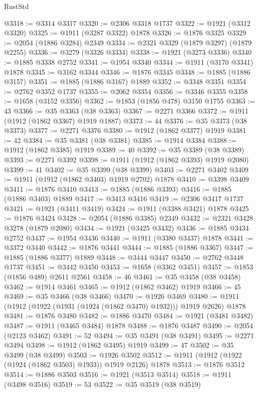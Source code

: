 \begin{lexlean}{RustStd}
\begin{coremodule}
@3318 := @3314 @3317
@3320 := @2306 @3318 @1737
@3322 := @1921 (@3312 @3320)
@3325 := @1911 (@3287 @3322) @1878
@3326 := @1876 @3325
@3329 := @2054 (@1886 @3284) @2349
@3334 := @2321 @3329 (@1879 @3297) (@1879 @2255)
@3336 := @3279 (@3326 @3334)
@3338 := @1921 (@3273 @3336)
@3340 := @1885 @3338 @2752
@3341 := @1954 @3340
@3344 := @1911 (@3170 @3341) @1878
@3345 := @3162 @3344
@3346 := @1876 @3345
@3348 := @1885 (@1886 @3157)
@3351 := @1885 (@1886 @3167) @1889
@3352 := @3348 @3351
@3354 := @2762 @3352 @1737
@3355 := @2062 @3354
@3356 := @3346 @3355
@3358 := @1658 (@3152 @3356)
@3362 := @1853 (@1856 @478) @3150 @1755
@3363 := 43
@3366 := @35 @3363 (@38 @3363)
@3367 := @2271 @3366
@3372 := @1911 (@1912 (@1862 @3367) @1919 @1887)
@3373 := 44
@3376 := @35 @3373 (@38 @3373)
@3377 := @2271 @3376
@3380 := @1912 (@1862 @3377) @1919
@3381 := 42
@3384 := @35 @3381 (@38 @3381)
@3385 := @1914 @3384
@3388 := @1912 (@1862 @3385) @1919
@3389 := 40
@3392 := @35 @3389 (@38 @3389)
@3393 := @2271 @3392
@3398 := @1911 (@1912 (@1862 @3393) @1919 @2080)
@3399 := 41
@3402 := @35 @3399 (@38 @3399)
@3403 := @2271 @3402
@3409 := @1911 (@1912 (@1862 @3403) @1919 @2702) @1878
@3410 := @3398 @3409
@3411 := @1876 @3410
@3413 := @1885 (@1886 @3393)
@3416 := @1885 (@1886 @3403) @1889
@3417 := @3413 @3416
@3419 := @2306 @3417 @1737
@3421 := @1921 (@3411 @3419)
@3424 := @1911 (@3388 @3421) @1878
@3425 := @1876 @3424
@3428 := @2054 (@1886 @3385) @2349
@3432 := @2321 @3428 @3278 (@1879 @2080)
@3434 := @1921 (@3425 @3432)
@3436 := @1885 @3434 @2752
@3437 := @1954 @3436
@3440 := @1911 (@3380 @3437) @1878
@3441 := @3372 @3440
@3442 := @1876 @3441
@3444 := @1885 (@1886 @3367)
@3447 := @1885 (@1886 @3377) @1889
@3448 := @3444 @3447
@3450 := @2762 @3448 @1737
@3451 := @3442 @3450
@3453 := @1658 (@3362 @3451)
@3457 := @1853 (@1856 @489) @2611 @2561
@3458 := 46
@3461 := @35 @3458 (@38 @3458)
@3462 := @1914 @3461
@3465 := @1912 (@1862 @3462) @1919
@3466 := 45
@3469 := @35 @3466 (@38 @3466)
@3470 := @1926 @3469
@3480 := @1911 (@1912 (@1922 (@1931 (@1924 (@1862 @3470) @1932))) @1919 @2626) @1878
@3481 := @1876 @3480
@3482 := @1886 @3470
@3484 := @1921 (@3481 @3482)
@3487 := @1911 (@3465 @3484) @1878
@3488 := @1876 @3487
@3490 := @2054 (@2123 @3462)
@3491 := 52
@3494 := @35 @3491 (@38 @3491)
@3495 := @2271 @3494
@3498 := @1912 (@1862 @3495) @1919
@3499 := 47
@3502 := @35 @3499 (@38 @3499)
@3503 := @1926 @3502
@3512 := @1911 (@1912 (@1922 (@1924 (@1862 @3503) @1933)) @1919 @2126) @1878
@3513 := @1876 @3512
@3514 := @1886 @3503
@3516 := @1921 (@3513 @3514)
@3518 := @1911 (@3498 @3516)
@3519 := 53
@3522 := @35 @3519 (@38 @3519)

\end{coremodule}
\end{lexlean}
